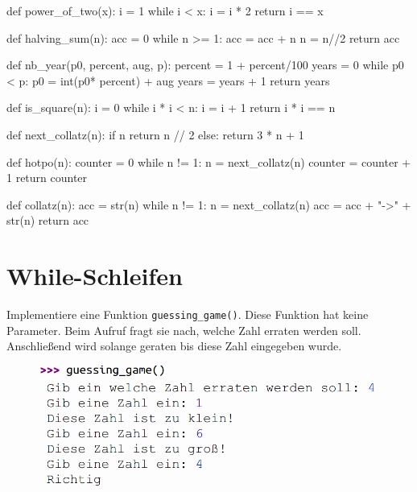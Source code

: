 \documentclass[class=scrartcl, crop=false]{standalone}
\newcommand{\expandpyconc}[1]{\expandafter\reallyexpandpyconc\expandafter{#1}}
\newcommand{\reallyexpandpyconc}[1]{\pyconc{exec(compile(open('#1', 'rb').read(), '#1', 'exec'))}}
\newenvironment{pyconcodeblck}[1]
{\newcommand{\snippetfile}{snippet-#1.py}
	\VerbatimEnvironment
	\begin{VerbatimOut}{\snippetfile}}
	{\end{VerbatimOut}
	\expandpyconc{\snippetfile}}
\begin{document}
\begin{pyconcodeblck}{while_schleifen}
def power_of_two(x):
    i = 1
    while i < x:
        i = i * 2    
    return i == x


def halving_sum(n): 
    acc = 0
    while n >= 1:
        acc = acc + n
        n = n//2
    return acc




def nb_year(p0, percent, aug, p):
    percent =  1 + percent/100
    years = 0
    while p0 < p:
        p0 = int(p0* percent) + aug
        years = years + 1
    return years


def is_square(n):    
    i = 0
    while i * i < n:
        i = i + 1
    return i * i == n

def next_collatz(n):
    if n %
        return n // 2
    else:
        return 3 * n + 1


def hotpo(n):
    counter = 0
    while n != 1:
        n = next_collatz(n)
        counter = counter + 1
    return counter



def collatz(n):
    acc = str(n)
    while n != 1:
        n = next_collatz(n)
        acc = acc + "->" + str(n)
    return acc


\end{pyconcodeblck}

\section{While-Schleifen}

\begin{aufgabe} \noindent
Implementiere eine Funktion \texttt{guessing_game()}. Diese Funktion hat keine Parameter. Beim Aufruf fragt sie nach, welche Zahl erraten werden soll. Anschließend wird solange geraten bis diese Zahl eingegeben wurde.

\begin{figure}[H]
	\centering	
	\includegraphics[width=0.7\linewidth]{guessing_game}

\end{figure}

\end{aufgabe}
\end{document}
